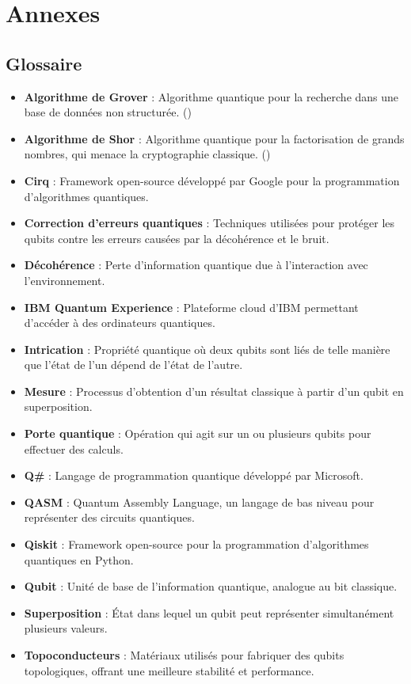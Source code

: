 \documentclass{article}
\begin{document}
\break\section{Annexes}
\subsection{Glossaire}
\begin{itemize}
  \item \textbf{Algorithme de Grover} : Algorithme quantique pour la recherche dans une base de données non structurée. (\cite{wikipediaAlgorithmeGrover})
  \item \textbf{Algorithme de Shor} : Algorithme quantique pour la factorisation de grands nombres, qui menace la cryptographie classique. (\cite{wikipediaAlgorithmeShor})
  \item \textbf{Cirq} : Framework open-source développé par Google pour la programmation d'algorithmes quantiques.
  \item \textbf{Correction d'erreurs quantiques} : Techniques utilisées pour protéger les qubits contre les erreurs causées par la décohérence et le bruit.
  \item \textbf{Décohérence} : Perte d'information quantique due à l'interaction avec l'environnement.
  \item \textbf{IBM Quantum Experience} : Plateforme cloud d'IBM permettant d'accéder à des ordinateurs quantiques.
  \item \textbf{Intrication} : Propriété quantique où deux qubits sont liés de telle manière que l'état de l'un dépend de l'état de l'autre.
  \item \textbf{Mesure} : Processus d'obtention d'un résultat classique à partir d'un qubit en superposition.
  \item \textbf{Porte quantique} : Opération qui agit sur un ou plusieurs qubits pour effectuer des calculs.
  \item \textbf{Q\#} : Langage de programmation quantique développé par Microsoft.
  \item \textbf{QASM} : Quantum Assembly Language, un langage de bas niveau pour représenter des circuits quantiques.
  \item \textbf{Qiskit} : Framework open-source pour la programmation d'algorithmes quantiques en Python.
  \item \textbf{Qubit} : Unité de base de l'information quantique, analogue au bit classique.
  \item \textbf{Superposition} : État dans lequel un qubit peut représenter simultanément plusieurs valeurs.
  \item \textbf{Topoconducteurs} : Matériaux utilisés pour fabriquer des qubits topologiques, offrant une meilleure stabilité et performance.
\end{itemize}
\end{document}
